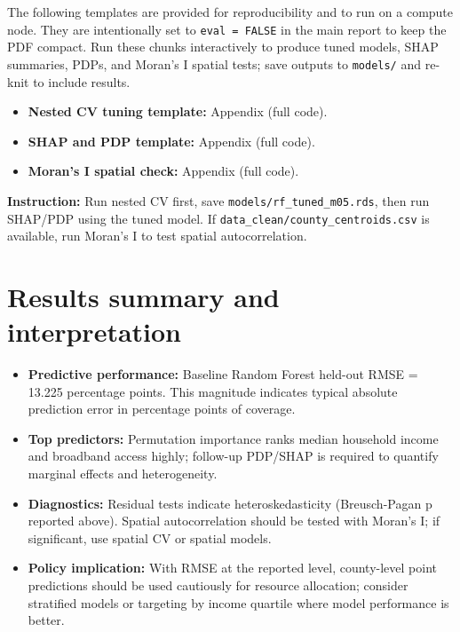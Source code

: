 \documentclass[
  11pt,
]{article}
\providecommand{\tightlist}{%
  \setlength{\itemsep}{0pt}\setlength{\parskip}{0pt}}
\begin{document}
The following templates are provided for reproducibility and to run on a
compute node. They are intentionally set to \texttt{eval\ =\ FALSE} in
the main report to keep the PDF compact. Run these chunks interactively
to produce tuned models, SHAP summaries, PDPs, and Moran's I spatial
tests; save outputs to \texttt{models/} and re-knit to include results.

\begin{itemize}
\tightlist
\item
  \textbf{Nested CV tuning template:} Appendix (full code).\\
\item
  \textbf{SHAP and PDP template:} Appendix (full code).\\
\item
  \textbf{Moran's I spatial check:} Appendix (full code).
\end{itemize}

\textbf{Instruction:} Run nested CV first, save
\texttt{models/rf\_tuned\_m05.rds}, then run SHAP/PDP using the tuned
model. If \texttt{data\_clean/county\_centroids.csv} is available, run
Moran's I to test spatial autocorrelation.

\newpage

\section{Results summary and
interpretation}\label{results-summary-and-interpretation}

\begin{itemize}
\tightlist
\item
  \textbf{Predictive performance:} Baseline Random Forest held-out RMSE
  = 13.225 percentage points. This magnitude indicates typical absolute
  prediction error in percentage points of coverage.\\
\item
  \textbf{Top predictors:} Permutation importance ranks median household
  income and broadband access highly; follow-up PDP/SHAP is required to
  quantify marginal effects and heterogeneity.\\
\item
  \textbf{Diagnostics:} Residual tests indicate heteroskedasticity
  (Breusch-Pagan p reported above). Spatial autocorrelation should be
  tested with Moran's I; if significant, use spatial CV or spatial
  models.\\
\item
  \textbf{Policy implication:} With RMSE at the reported level,
  county-level point predictions should be used cautiously for resource
  allocation; consider stratified models or targeting by income quartile
  where model performance is better.
\end{itemize}
\end{document}
